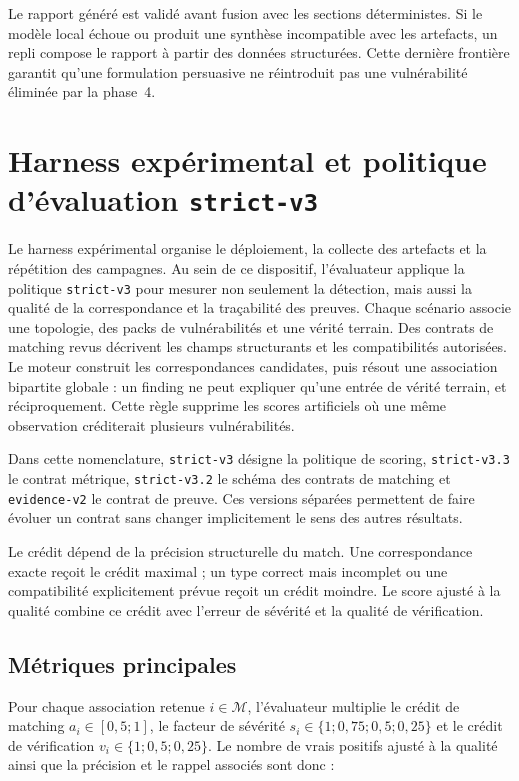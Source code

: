 Le rapport généré est validé avant fusion avec les sections déterministes. Si le
modèle local échoue ou produit une synthèse incompatible avec les artefacts, un
repli compose le rapport à partir des données structurées. Cette dernière
frontière garantit qu'une formulation persuasive ne réintroduit pas une
vulnérabilité éliminée par la phase~4.

\section{Harness expérimental et politique d'évaluation \texttt{\footnotesize strict-v3}}

Le harness expérimental organise le déploiement, la collecte des artefacts et
la répétition des campagnes. Au sein de ce dispositif, l'évaluateur applique
la politique \texttt{\footnotesize strict-v3} pour mesurer non seulement la détection, mais aussi la
qualité de la correspondance et la traçabilité des preuves. Chaque scénario
associe une topologie, des packs de vulnérabilités et une vérité terrain. Des
contrats de matching revus décrivent les champs structurants et les
compatibilités autorisées. Le moteur construit les correspondances candidates,
puis résout une association bipartite globale : un finding ne peut expliquer
qu'une entrée de vérité terrain, et réciproquement. Cette règle supprime les
scores artificiels où une même observation créditerait plusieurs vulnérabilités.

Dans cette nomenclature, \texttt{\footnotesize strict-v3} désigne la politique de scoring,
\texttt{\footnotesize strict-v3.3} le contrat métrique, \texttt{\footnotesize strict-v3.2} le schéma des
contrats de matching et \texttt{\footnotesize evidence-v2} le contrat de preuve. Ces
versions séparées permettent de faire évoluer un contrat sans changer
implicitement le sens des autres résultats.

Le crédit dépend de la précision structurelle du match. Une correspondance
exacte reçoit le crédit maximal ; un type correct mais incomplet ou une
compatibilité explicitement prévue reçoit un crédit moindre. Le score ajusté à
la qualité combine ce crédit avec l'erreur de sévérité et la qualité de
vérification.

\subsection{Métriques principales}
\label{sec:metriques-principales}

Pour chaque association retenue \(i\in\mathcal{M}\), l'évaluateur multiplie le
crédit de matching \(a_i\in[0{,}5;1]\), le facteur de sévérité
\(s_i\in\{1;0{,}75;0{,}5;0{,}25\}\) et le crédit de vérification
\(v_i\in\{1;0{,}5;0{,}25\}\). Le nombre de vrais positifs ajusté à la qualité
ainsi que la précision et le rappel associés sont donc :

